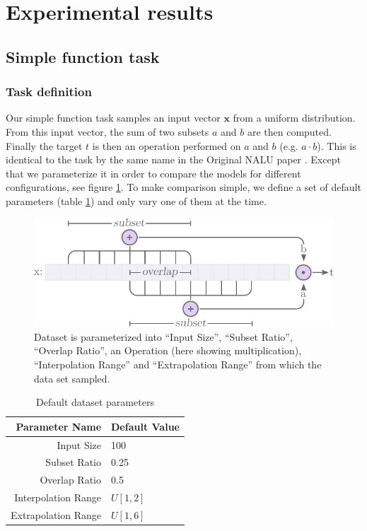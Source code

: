 \section{Experimental results}
\label{sec:experiments}

\subsection{Simple function task}

\subsubsection{Task definition}

Our simple function task samples an input vector $\mathbf{x}$ from a uniform distribution. From this input vector, the sum of two subsets $a$ and $b$ are then computed. Finally the target $t$ is then an operation performed on $a$ and $b$ (e.g. $a \cdot b$). This is identical to the task by the same name in the Original NALU paper \cite{trask-nalu}. Except that we parameterize it in order to compare the models for different configurations, see figure \ref{fig:simple-function-task-problem}. To make comparison simple, we define a set of default parameters (table \ref{tab:simple-function-task-defaults}) and only vary one of them at the time.

\begin{figure}[H]
\centering
\includegraphics[scale=0.8]{graphics/function_task_static_problem.pdf}
\caption{Dataset is parameterized into ``Input Size'', ``Subset Ratio'', ``Overlap Ratio'', an Operation (here showing multiplication), ``Interpolation Range'' and ``Extrapolation Range'' from which the data set sampled.}
\label{fig:simple-function-task-problem}
\end{figure}

\begin{table}[H]
\caption{Default dataset parameters}
\label{tab:simple-function-task-defaults}
\centering
\begin{tabular}{r l}
\toprule
 Parameter Name & Default Value \\
 \midrule
 Input Size & 100 \\
 Subset Ratio & 0.25 \\
 Overlap Ratio & 0.5 \\
 Interpolation Range & $U[1,2]$ \\
 Extrapolation Range & $U[1,6]$ \\
 \bottomrule
\end{tabular}
\end{table}


